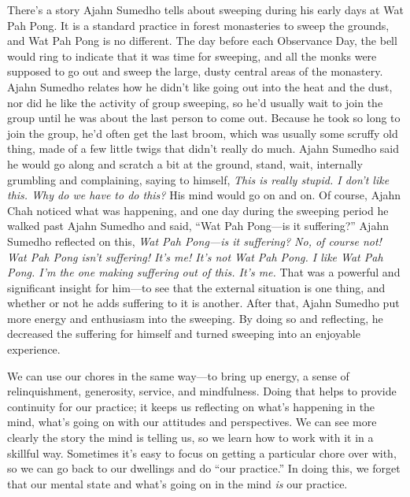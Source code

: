 There's a story Ajahn Sumedho tells about sweeping during his early 
days at Wat Pah Pong. It is a standard practice in forest monasteries 
to sweep the grounds, and Wat Pah Pong is no different. The day before 
each Observance Day, the bell would ring to indicate that it was time 
for sweeping, and all the monks were supposed to go out and sweep the 
large, dusty central areas of the monastery. Ajahn Sumedho relates how 
he didn't like going out into the heat and the dust, nor did he like 
the activity of group sweeping, so he'd usually wait to join the group 
until he was about the last person to come out. Because he took so long 
to join the group, he'd often get the last broom, which was usually 
some scruffy old thing, made of a few little twigs that didn't really 
do much. Ajahn Sumedho said he would go along and scratch a bit at the 
ground, stand, wait, internally grumbling and complaining, saying to 
himself, \emph{This is really stupid. I don't like this. Why do we have 
to do this?} His mind would go on and on. Of course, Ajahn Chah noticed 
what was happening, and one day during the sweeping period he walked 
past Ajahn Sumedho and said, ``Wat Pah Pong---is it suffering?'' Ajahn 
Sumedho reflected on this, \emph{Wat Pah Pong---is it suffering? No, of 
course not! Wat Pah Pong isn't suffering! It's me! It's not Wat Pah 
Pong. I like Wat Pah Pong. I'm the one making suffering out of this. 
It's me.} That was a powerful and significant insight for him---to see 
that the external situation is one thing, and whether or not he adds 
suffering to it is another. After that, Ajahn Sumedho put more energy 
and enthusiasm into the sweeping. By doing so and reflecting, he 
decreased the suffering for himself and turned sweeping into an 
enjoyable experience.

We can use our chores in the same way---to bring up energy, a sense of 
relinquishment, generosity, service, and mindfulness. Doing that helps 
to provide continuity for our practice; it keeps us reflecting on 
what's happening in the mind, what's going on with our attitudes and 
perspectives. We can see more clearly the story the mind is telling us, 
so we learn how to work with it in a skillful way. Sometimes it's easy 
to focus on getting a particular chore over with, so we can go back to 
our dwellings and do ``our practice.'' In doing this, we forget that 
our mental state and what's going on in the mind \emph{is} our practice.


